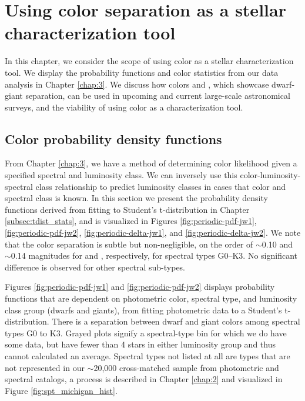 \chapter{Using color separation as a stellar characterization tool}\label{chap:4}

In this chapter, we consider the scope of using color as a stellar characterization tool. We display the probability functions and color statistics from our data analysis in Chapter \ref{chap:3}. We discuss how colors \jwone and \jwtwo, which showcase dwarf-giant separation, can be used in upcoming and current large-scale astronomical surveys, and the viability of using color as a characterization tool.

\section{Color probability density functions} \label{sec:color_prob_func}

From Chapter \ref{chap:3}, we have a method of determining color likelihood given a specified spectral and luminosity class. We can inversely use this color-luminosity-spectral class relationship to predict luminosity classes in cases that color and spectral class 
is known. In this section we present the probability density functions derived from fitting to Student's t-distribution in Chapter \ref{subsec:tdist_stats}, and is visualized in Figures \ref{fig:periodic-pdf-jw1},  \ref{fig:periodic-pdf-jw2}, \ref{fig:periodic-delta-jw1}, and \ref{fig:periodic-delta-jw2}. We note that the color separation is subtle but non-negligible, on the order of $\sim$0.10 and $\sim$0.14 magnitudes for \jwone and \jwtwo, respectively, for spectral types G0--K3. No significant difference is observed for other spectral sub-types.

Figures \ref{fig:periodic-pdf-jw1} and \ref{fig:periodic-pdf-jw2} displays probability functions that are dependent on photometric color, spectral type, and luminosity class group (dwarfs and giants), from fitting photometric data to a Student's t-distribution. There is a separation between dwarf and giant colors among spectral types G0 to K3. Grayed plots signify a spectral-type bin for which we do have some data, but have fewer than 4 stars in either luminosity group and thus cannot calculated an average. Spectral types not listed at all are types that are not represented in our $\sim$20,000 cross-matched sample from photometric and spectral catalogs, a process is described in Chapter \ref{chap:2} and visualized in Figure \ref{fig:spt_michigan_hist}.

